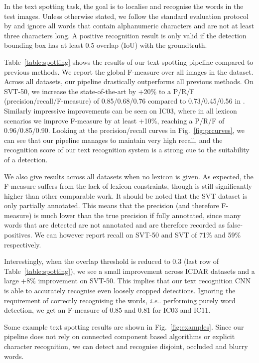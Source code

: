 \documentclass[twocolumn]{svjour3}          \smartqed  \usepackage{epsfig}
\makeatletter
\DeclareRobustCommand\onedot{\futurelet\@let@token\@onedot}
\def\@onedot{\ifx\@let@token.\else.\null\fi\xspace}
\def\ie{\emph{i.e}\onedot} \def\Ie{\emph{I.e}\onedot}
\makeatother
\begin{document}
In the text spotting task, the goal is to localise and recognise the words in the test images. Unless otherwise stated, we follow the standard evaluation protocol by \cite{Wang11} and ignore all words that contain alphanumeric characters and are not at least three characters long. A positive recognition result is only valid if the detection bounding box has at least 0.5 overlap (IoU) with the groundtruth.

Table~\ref{table:spotting} shows the results of our text spotting pipeline compared to previous methods. We report the global F-measure over all images in the dataset. Across all datasets, our pipeline drastically outperforms all previous methods. On SVT-50, we increase the state-of-the-art by +20\% to a P/R/F (precision/recall/F-measure) of 0.85/0.68/0.76 compared to 0.73/0.45/0.56 in \cite{Jaderberg14a}. Similarly impressive improvements can be seen on IC03, where in all lexicon scenarios we improve F-measure by at least +10\%, reaching a P/R/F of 0.96/0.85/0.90. Looking at the precision/recall curves in Fig.~\ref{fig:prcurves}, we can see that our pipeline manages to maintain very high recall, and the recognition score of our text recognition system is a strong cue to the suitability of a detection.

We also give results across all datasets when no lexicon is given.  As expected, the F-measure suffers from the lack of lexicon constraints, though is still significantly higher than other comparable work. It should be noted that the SVT dataset is only partially annotated. This means that the precision (and therefore F-measure) is much lower than the true precision if fully annotated, since many words that are detected are not annotated and are therefore recorded as false-positives. We can however report recall on SVT-50 and SVT of 71\% and 59\% respectively.

Interestingly, when the overlap threshold is reduced to 0.3 (last row of Table~\ref{table:spotting}), we see a small improvement across ICDAR datasets and a large +8\% improvement on SVT-50. This implies that our text recognition CNN is able to accurately recognise even loosely cropped detections. Ignoring the requirement of correctly recognising the words, \ie performing purely word detection, we get an F-measure of 0.85 and 0.81 for IC03 and IC11.

Some example text spotting results are shown in Fig.~\ref{fig:examples}. Since our pipeline does not rely on connected component based algorithms or explicit character recognition, we can detect and recognise disjoint, occluded and blurry words. 
\end{document}

